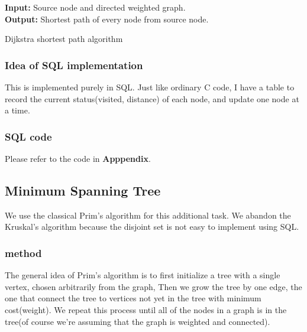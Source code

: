 \begin{algorithm}[!htbf]
{\bf Input:} Source node and directed weighted graph. \\
{\bf Output:} Shortest path of every node from source node. 
\begin{algorithmic}
\caption{Dijkstra shortest path algorithm}
\ENDFOR
{}
        \ENDIF
    \ENDFOR
\ENDWHILE
\end{algorithmic}
\label{algo:dijkstra}
\end{algorithm}

\subsubsection{Idea of SQL implementation}
This is implemented purely in SQL. Just like ordinary C code, I have a table to record the current status(visited, distance) of each node, and update one node at a time. 

\subsubsection{SQL code}
Please refer to the code in {\bf Apppendix}.

\subsection{Minimum Spanning Tree}
We use the classical Prim's algorithm for this additional task. We abandon the Kruskal's algorithm because the disjoint set is not easy to implement using SQL.

\subsubsection{method}
The general idea of Prim's algorithm is to first initialize a tree with a single vertex, chosen arbitrarily from the graph, Then we grow the tree by one edge, the one that connect
the tree to vertices not yet in the tree with minimum cost(weight). We repeat this process until all of the nodes in a graph is in the tree(of course we're assuming that the graph is weighted and connected).

